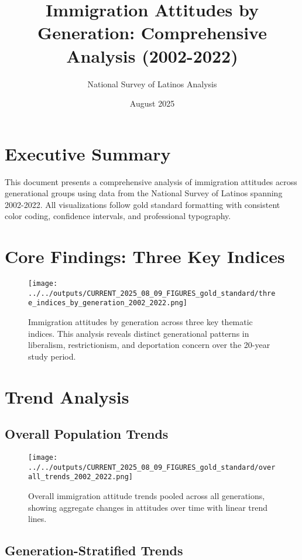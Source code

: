 \documentclass{article}
\title{Immigration Attitudes by Generation: Comprehensive Analysis (2002-2022)}
\author{National Survey of Latinos Analysis}
\date{August 2025}
\begin{document}
\maketitle

\section*{Executive Summary}

This document presents a comprehensive analysis of immigration attitudes across generational groups using data from the National Survey of Latinos spanning 2002-2022. All visualizations follow gold standard formatting with consistent color coding, confidence intervals, and professional typography.

\section{Core Findings: Three Key Indices}

\begin{figure}[H]
    \centering
    \texttt{[image: ../../outputs/CURRENT\_2025\_08\_09\_FIGURES\_gold\_standard/three\_indices\_by\_generation\_2002\_2022.png]}
    \caption{Immigration attitudes by generation across three key thematic indices. This analysis reveals distinct generational patterns in liberalism, restrictionism, and deportation concern over the 20-year study period.}
    \label{fig:three_indices}
\end{figure}

\section{Trend Analysis}

\subsection{Overall Population Trends}

\begin{figure}[H]
    \centering
    \texttt{[image: ../../outputs/CURRENT\_2025\_08\_09\_FIGURES\_gold\_standard/overall\_trends\_2002\_2022.png]}
    \caption{Overall immigration attitude trends pooled across all generations, showing aggregate changes in attitudes over time with linear trend lines.}
    \label{fig:overall_trends}
\end{figure}

\subsection{Generation-Stratified Trends}
\end{document}
